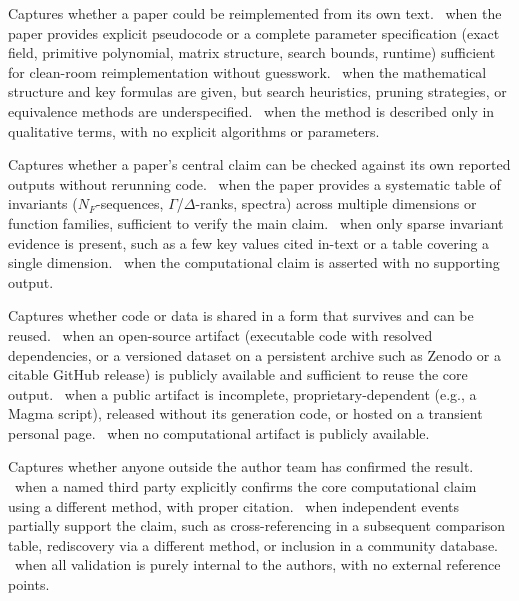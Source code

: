 \begin{description}\itemsep2pt
\item[R1 -- Methodological Disclosure.] Captures whether a paper could be
reimplemented from its own text. \gf\ when the paper provides explicit
pseudocode or a complete parameter specification (exact field, primitive
polynomial, matrix structure, search bounds, runtime) sufficient for clean-room
reimplementation without guesswork. \gh\ when the mathematical structure and key
formulas are given, but search heuristics, pruning strategies, or equivalence
methods are underspecified. \go\ when the method is described only in
qualitative terms, with no explicit algorithms or parameters.

\item[R2 -- Numerical Verification Metadata.] Captures whether a paper's central
claim can be checked against its own reported outputs without rerunning code.
\gf\ when the paper provides a systematic table of invariants ($N_F$-sequences,
$\Gamma$/$\Delta$-ranks, spectra) across multiple dimensions or function
families, sufficient to verify the main claim. \gh\ when only sparse invariant
evidence is present, such as a few key values cited in-text or a table covering
a single dimension. \go\ when the computational claim is asserted with no
supporting output.

\item[R3 -- Artifact Availability.] Captures whether code or data is shared in a
form that survives and can be reused. \gf\ when an open-source artifact
(executable code with resolved dependencies, or a versioned dataset on a
persistent archive such as Zenodo or a citable GitHub release) is publicly
available and sufficient to reuse the core output. \gh\ when a public artifact
is incomplete, proprietary-dependent (e.g., a Magma script), released without
its generation code, or hosted on a transient personal page. \go\ when no
computational artifact is publicly available.

\item[R4 -- External Corroboration.] Captures whether anyone outside the author
team has confirmed the result. \gf\ when a named third party explicitly confirms
the core computational claim using a different method, with proper citation.
\gh\ when independent events partially support the claim, such as
cross-referencing in a subsequent comparison table, rediscovery via a different
method, or inclusion in a community database. \go\ when all validation is purely
internal to the authors, with no external reference points.
\end{description}

